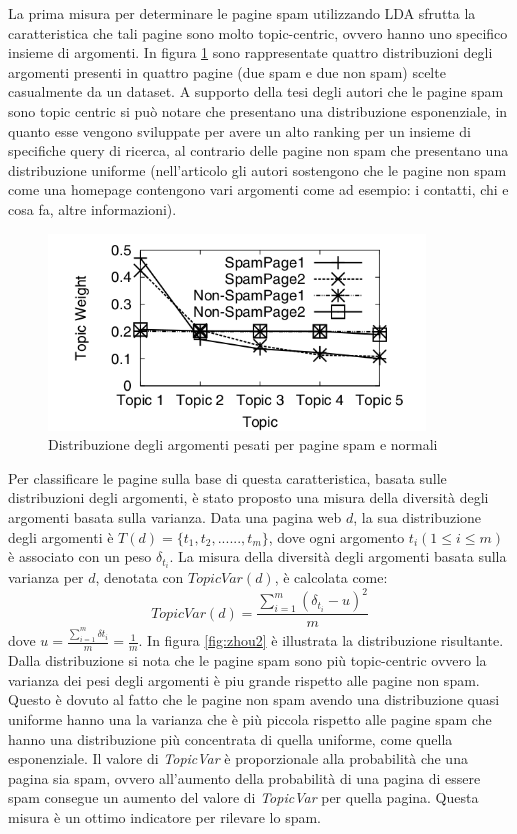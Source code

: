 La prima misura per determinare le pagine spam utilizzando LDA sfrutta la caratteristica che tali pagine sono molto topic-centric, ovvero hanno uno specifico insieme di argomenti. In figura \ref{fig:zhou1} sono rappresentate quattro distribuzioni degli argomenti presenti in quattro pagine (due spam e due non spam) scelte casualmente da un dataset. A supporto della tesi degli autori che le pagine spam sono topic centric si può notare che presentano una distribuzione esponenziale, in quanto esse vengono sviluppate per avere un alto ranking per un insieme di  specifiche query di ricerca, al contrario delle pagine non spam che presentano una distribuzione uniforme (nell'articolo gli autori sostengono che le pagine non spam come una homepage contengono vari argomenti come ad esempio: i contatti, chi e cosa fa, altre informazioni).
\begin{figure}
\centering
\includegraphics[width=10cm]{immagini/zhou/immagine1.png}
\caption{Distribuzione degli argomenti pesati per pagine spam e normali}
\label{fig:zhou1}
\end{figure}
Per classificare le pagine sulla base di questa caratteristica, basata sulle distribuzioni degli argomenti, è stato proposto una misura della  diversità degli argomenti basata sulla varianza. Data una pagina web \(d\), la sua distribuzione degli argomenti è \(T(d)=\{t_1,t_2,......,t_m\}\), dove ogni argomento \(t_i (1 \leq i \leq m)\) è associato con un peso \(\delta_{t_i}\). La misura della diversità degli argomenti basata sulla varianza per \(d\), denotata con \(TopicVar(d)\), è calcolata come:
\begin{equation}
TopicVar(d)=\frac{\sum_{i=1}^m (\delta_{t_i}-u)^2}{m}
\end{equation}
dove \(u=\frac{\sum_{i=1}^m\delta{t_i}}{m}=\frac{1}{m}\).
In figura \ref{fig:zhou2} è illustrata la distribuzione risultante. Dalla distribuzione si nota che le pagine spam sono più topic-centric ovvero la varianza dei pesi degli argomenti è piu grande rispetto alle pagine non spam. Questo è dovuto al fatto che le pagine non spam avendo una distribuzione quasi uniforme hanno una la varianza che è più piccola rispetto alle pagine spam che hanno una distribuzione più concentrata di quella uniforme, come quella esponenziale. Il valore di \textit{TopicVar} è proporzionale alla probabilità che una pagina sia spam, ovvero all'aumento della probabilità di una pagina di essere spam consegue un aumento del valore di \textit{TopicVar} per quella pagina. Questa misura è un ottimo indicatore per rilevare lo spam.
